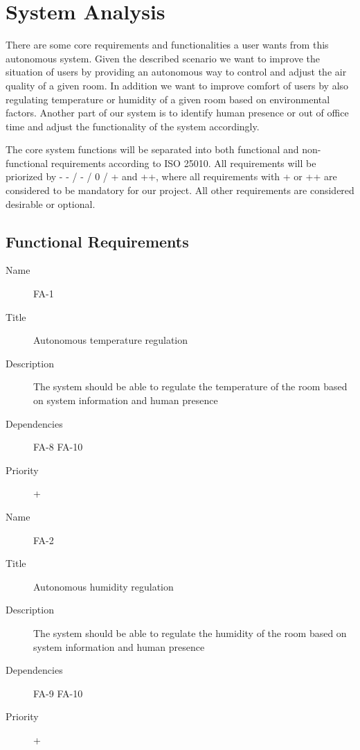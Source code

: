 
\section{System Analysis}
There are some core requirements and functionalities a user wants from this autonomous system.
Given the described scenario we want to improve the situation of users by providing an autonomous way to control and adjust the air quality of a given room.
In addition we want to improve comfort of users by also regulating temperature or humidity of a given room based on environmental factors.
Another part of our system is to identify human presence or out of office time and adjust the functionality of the system accordingly.

The core system functions will be separated into both functional and non-functional requirements according to ISO 25010.
All requirements will be priorized by - - / - / 0 / + and ++, where all requirements with + or ++ are considered to be mandatory for our project.
All other requirements are considered desirable or optional.

\subsection{Functional Requirements}

\begin{description}
    \item[Name] FA-1
    \item[Title] Autonomous temperature regulation
    \item[Description] The system should be able to regulate the temperature of the room based on system information and human presence
    \item[Dependencies] FA-8 FA-10
    \item[Priority] +
\end{description}

\begin{description}
    \item[Name] FA-2
    \item[Title] Autonomous humidity regulation
    \item[Description] The system should be able to regulate the humidity of the room based on system information and human presence
    \item[Dependencies] FA-9 FA-10
    \item[Priority] +
\end{description}


